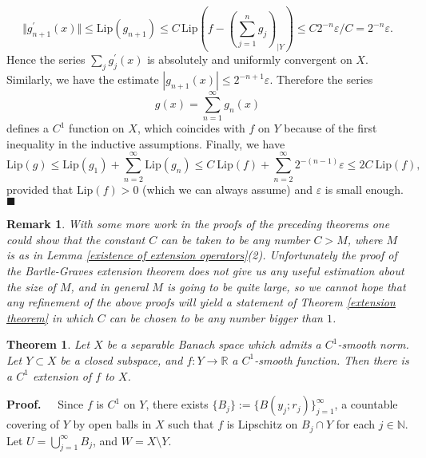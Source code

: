 \documentclass[11pt]{amsproc}%
\theoremstyle{plain}
\newtheorem{remark}{Remark}
\newtheorem{theorem}{Theorem}
\numberwithin{equation}{section}
\begin{document}
\[
\Vert g_{n+1}^{\prime}(x)\Vert\leq\text{Lip}(g_{n+1})\leq C\,\text{Lip}\left(
f-(\sum_{j=1}^{n}g_{j})_{|Y}\right)  \leq C2^{-n}\varepsilon/C=2^{-n}%
\varepsilon.
\]
Hence the series $\sum_{j}g_{j}^{\prime}(x)$ is absolutely and uniformly
convergent on $X$. Similarly, we have the estimate $|g_{n+1}(x)|\leq
2^{-n+1}\varepsilon$. Therefore the series
\[
g(x)=\sum_{n=1}^{\infty}g_{n}(x)
\]
defines a $C^{1}$ function on $X$, which coincides with $f$ on $Y$ because of
the first inequality in the inductive assumptions. Finally, we have
\[
\text{Lip}(g)\leq\text{Lip}(g_{1})+\sum_{n=2}^{\infty}\text{Lip}(g_{n})\leq
C\ \text{Lip}(f)+\sum_{n=2}^{\infty}2^{-\left(  n-1\right)  }\varepsilon
\leq2C\ \text{Lip}(f),
\]
provided that $\text{Lip}(f)>0$ (which we can always assume) and $\varepsilon$
is small enough. $\blacksquare$

\medskip

\begin{remark}
\emph{With some more work in the proofs of the preceding theorems one could
show that the constant $C$ can be taken to be any number $C>M$, where $M$ is
as in Lemma \ref{existence of extension operators}(2). Unfortunately the proof
of the Bartle-Graves extension theorem does not give us any useful estimation
about the size of $M$, and in general $M$ is going to be quite large, so we
cannot hope that any refinement of the above proofs will yield a statement of
Theorem \ref{extension theorem} in which $C$ can be chosen to be any number
bigger than $1$.}
\end{remark}

\medskip

\begin{theorem}
Let $X$ be a separable Banach space which admits a $C^{1}$-smooth norm. Let
$Y\subset X$ be a closed subspace, and $f:Y\rightarrow\mathbb{R}$ a $C^{1}%
$-smooth function. Then there is a $C^{1}$ extension of $f$ to $X$.
\end{theorem}

\noindent\textbf{Proof.\ \ } Since $f$ is $C^{1}$ on $Y$, there exists
$\{B_{j}\}:=\{B(y_{j};r_{j})\}_{j=1}^{\infty}$, a countable covering of $Y$ by
open balls in $X$ such that $f$ is Lipschitz on $B_{j}\cap Y$ for each
$j\in\mathbb{N}$. Let $U=\bigcup_{j=1}^{\infty}B_{j}$, and $W=X\setminus Y$.
\end{document}
